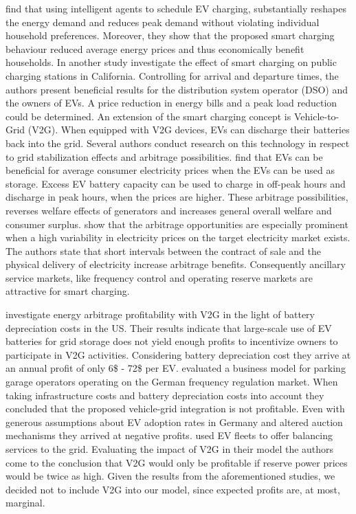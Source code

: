 \documentclass[12pt, article]{article}
\begin{document}
\textcite{valogianni14_effec_manag_elect_vehic_storag} find that using intelligent
agents to schedule EV charging, substantially reshapes the energy demand and
reduces peak demand without violating individual household preferences. Moreover,
they show that the proposed smart charging behaviour reduced average energy
prices and thus economically benefit households. In another study
\textcite{kara15_estim_benef_elect_vehic_smart} investigate the effect of smart
charging on public charging stations in California. Controlling for
arrival and departure times, the authors present beneficial results for the
distribution system operator (DSO) and the owners of EVs. A price
reduction in energy bills and a peak load reduction could be determined.
An extension of the smart charging concept is Vehicle-to-Grid (V2G). When
equipped with V2G devices, EVs can discharge their batteries back into the grid.
Several authors conduct research on this technology in respect to grid stabilization
effects and arbitrage possibilities.
\textcite{schill11_elect_vehic_imper_elect_market} find that EVs can be beneficial
for average consumer electricity prices when the EVs can be used as storage.
Excess EV battery capacity can be used to charge in off-peak hours and discharge
in peak hours, when the prices are higher. These arbitrage possibilities,
reverses welfare effects of generators and increases general overall welfare and
consumer surplus. \textcite{tomic07_using_fleet_elect_drive_vehic_grid_suppor}
show that the arbitrage opportunities are especially prominent when a high
variability in electricity prices on the target electricity market exists. The
authors state that short intervals between the contract of sale and the physical
delivery of electricity increase arbitrage benefits. Consequently ancillary service
markets, like frequency control and operating reserve markets are attractive for
smart charging.

\textcite{peterson10_econom_using_plug_in_hybrid} investigate energy arbitrage
profitability with V2G in the light of battery depreciation costs in the US.
Their results indicate that large-scale use of EV batteries for grid storage
does not yield enough profits to incentivize owners to participate in V2G
activities. Considering battery depreciation cost they arrive at an annual
profit of only 6\$ - 72\$ per EV.
\textcite{brandt17_evaluat_busin_model_vehic_grid_integ} evaluated a business
model for parking garage operators operating on the German frequency regulation
market. When taking infrastructure costs and battery depreciation costs into
account they concluded that the proposed vehicle-grid integration is not
profitable. Even with generous assumptions about EV adoption rates in Germany
and altered auction mechanisms they arrived at negative profits.
\parencite{kahlen17_fleet} used EV fleets to offer balancing services to the grid.
Evaluating the impact of V2G in their model the authors come to the conclusion
that V2G would only be profitable if reserve power prices would be twice as
high. Given the results from the aforementioned studies, we decided not to
include V2G into our model, since expected profits are, at most, marginal.
\end{document}
